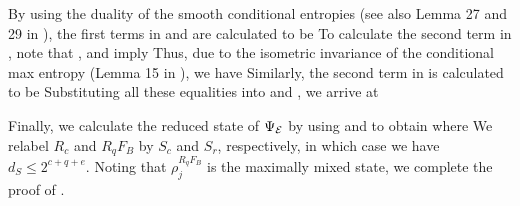 \documentclass[journal]{IEEEtran}
\begin{document}
By using the duality of the smooth conditional entropies \cite{tomamichel2010duality} (see also Lemma 27 and 29 in \cite{wakakuwa2019one}),
the first terms in  and  are calculated to be
To calculate the second term in , note that ,  and  imply
Thus, due to the isometric invariance of the conditional max entropy (Lemma 15 in \cite{tomamichel2010duality}), we have
Similarly, the second term in  is calculated to be
Substituting all these equalities into  and , we arrive at



Finally, we calculate the reduced state of $\Psi_{{\mathcal E}}$ by using   and  to obtain
where
We relabel $R_c$ and $R_qF_B$ by $S_c$ and $S_r$, respectively, in which case we have $d_S\leq2^{c+q+e}$.
Noting that $\rho_j^{R_qF_B}$ is the maximally mixed state, we complete the proof of .
\QED
\end{document}
